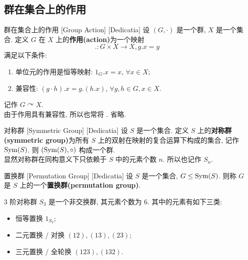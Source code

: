     \subsection{群在集合上的作用}

        \begin{dfn}
            {群在集合上的作用}
            [Group Action]
            [Dedicatia]
            设 \((G,\cdot)\) 是一个群, \(X\) 是一个集合. 定义 \(G\) 在 \(X\) 上的\textbf{作用(action)}为一个映射
            \[. : G\times X \to X, g.x=y\]
            满足以下条件:
            \begin{enumerate}
                \item 单位元的作用是恒等映射: \(1_G.x=x\), \(\forall x\in X\);
                \item 兼容性: \((g\cdot h).x=g.(h.x)\), \(\forall g,h\in G, x\in X\).
            \end{enumerate}
            记作 \(G\curvearrowright X\). \\
            由于作用具有兼容性, 所以也常将 \(.\) 省略. 
        \end{dfn}

        \begin{dfn}
            [SymmetricGroup]
            {对称群}
            [Symmetric Group]
            [Dedicatia]
            设 \(S\) 是一个集合. 定义 \(S\) 上的\textbf{对称群(symmetric group)}为所有 \(S\) 上的双射在映射的复合运算下构成的集合, 记作 \(\operatorname{Sym}(S)\). 则 \((\operatorname{Sym}(S),\circ)\) 构成一个群.\\
            显然对称群在同构意义下只依赖于 \(S\) 中的元素个数 \(n\). 所以也记作 \(S_n\).
        \end{dfn}

        \begin{dfn}
            {置换群}
            [Permutation Group]
            [Dedicatia]
            设 \(S\) 是一个集合, \(G\leq \operatorname{Sym}(S)\). 则称 \(G\) 是 \(S\) 上的一个\textbf{置换群(permutation group)}.
        \end{dfn}

        \begin{ins}
            {3 阶对称群}
            \(S_3\) 是一个非交换群, 其元素个数为 \(6\). 其中的元素有如下三类:
            \begin{itemize}
                \item 恒等置换 \(1_{S_3}\);
                \item 二元置换 / 对换 \((12), (13), (23)\);
                \item 三元置换 / 全轮换 \((123), (132)\).
            \end{itemize}
        \end{ins}

